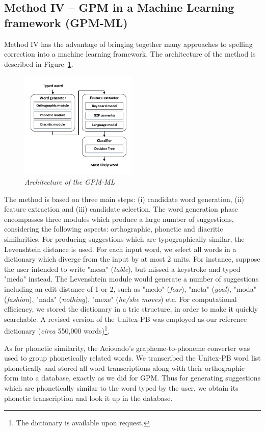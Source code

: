\subsection{Method IV -- GPM in a Machine Learning framework (GPM-ML)}

Method IV has the advantage of bringing together many approaches to spelling correction into a machine learning framework. The architecture of the method is described in Figure~\ref{fig:sys3-architecture}. 

\begin{figure}[h!]
  \centering
    \includegraphics[width=0.5\textwidth]{gfx/speller_architecture.pdf}
\caption{\label{fig:sys3-architecture} \it Architecture of the GPM-ML}
\end{figure}
The method is based on three main steps: (i) candidate word generation, (ii) feature extraction and (iii) candidate selection. 
The word generation phase encompasses three modules which produce a large number of suggestions, considering the following aspects: orthographic, phonetic and diacritic similarities.
For producing suggestions which are typographically similar, the Levenshtein distance is used. For each input word, we select all words in a dictionary which diverge from the input by at most 2 units. For instance, suppose the user intended to write "mesa" (\emph{table}),  
but missed a keystroke and typed "meda" instead. The Levenshtein module would generate a number of suggestions including an edit distance of 1 or 2, such as "medo" (\emph{fear}), "meta" (\emph{goal}), "moda" (\emph{fashion}), "nada" (\emph{nothing}), "mexe" (\emph{he/she moves}) etc. For computational efficiency, we stored the dictionary in a trie structure, in order to make it quickly searchable. A revised version of the Unitex-PB was employed as our reference dictionary (\emph{circa} 550,000 words)\footnote{The dictionary is available upon request.}.

As for phonetic similarity, the Aeiouado's grapheme-to-phoneme converter \cite{Mendonca2014} was used to group phonetically related words. We transcribed the Unitex-PB word list  phonetically and stored all word transcriptions along with their orthographic form into a database, exactly as we did for GPM. Thus for generating suggestions which are phonetically similar to the word typed by the user, we obtain its phonetic transcription and look it up in the database.

